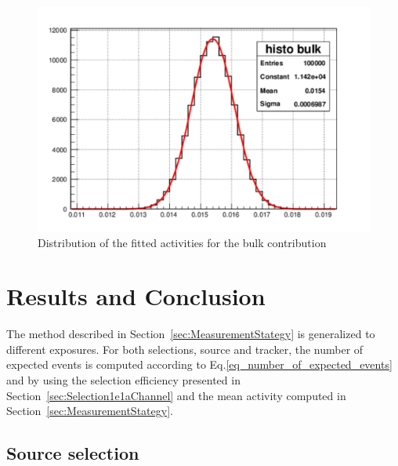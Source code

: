 \documentclass[main.tex]{subfiles}
\begin{document}
\begin{figure}[h!]
\begin{center}
\includegraphics[scale=0.5]{pictures/Chap5/gaussian_bulk_activity.pdf}
\caption{Distribution of the fitted activities for the bulk contribution}
\label{gaus}
\end{center}
\end{figure}


\FloatBarrier




\section{Results and Conclusion}\label{sec:Results}


\noindent The method described in Section~\ref{sec:MeasurementStategy} is generalized to different exposures. For both selections, source and tracker, the number of expected events is computed according to Eq.\ref{eq_number_of_expected_events} and by using the selection efficiency presented in Section~\ref{sec:Selection1e1aChannel} and the mean activity computed in Section~\ref{sec:MeasurementStategy}.


\subsection{Source selection}
\end{document}
